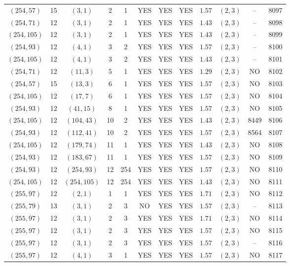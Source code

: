 \begin{longtable}{|c|c|c|c|c|c|c|c|c|c|c|c|}
$(254,57)$ & 15 & $(3,1)$ & 2 & 1 & YES & YES & YES & $1.57$ & $(2,3)$ & -- & 8097\\
$(254,71)$ & 12 & $(3,1)$ & 2 & 1 & YES & YES & YES & $1.43$ & $(2,3)$ & -- & 8098\\
$(254,105)$ & 12 & $(3,1)$ & 2 & 1 & YES & YES & YES & $1.43$ & $(2,3)$ & -- & 8099\\
$(254,93)$ & 12 & $(4,1)$ & 3 & 2 & YES & YES & YES & $1.57$ & $(2,3)$ & -- & 8100\\
$(254,105)$ & 12 & $(4,1)$ & 3 & 2 & YES & YES & YES & $1.43$ & $(2,3)$ & -- & 8101\\
$(254,71)$ & 12 & $(11,3)$ & 5 & 1 & YES & YES & YES & $1.29$ & $(2,3)$ & NO & 8102\\
$(254,57)$ & 15 & $(13,3)$ & 6 & 1 & YES & YES & YES & $1.57$ & $(2,3)$ & NO & 8103\\
$(254,105)$ & 12 & $(17,7)$ & 6 & 1 & YES & YES & YES & $1.57$ & $(2,3)$ & NO & 8104\\
$(254,93)$ & 12 & $(41,15)$ & 8 & 1 & YES & YES & YES & $1.57$ & $(2,3)$ & NO & 8105\\
$(254,105)$ & 12 & $(104,43)$ & 10 & 2 & YES & YES & YES & $1.43$ & $(2,3)$ & 8449 & 8106\\
$(254,93)$ & 12 & $(112,41)$ & 10 & 2 & YES & YES & YES & $1.57$ & $(2,3)$ & 8564 & 8107\\
$(254,105)$ & 12 & $(179,74)$ & 11 & 1 & YES & YES & YES & $1.43$ & $(2,3)$ & NO & 8108\\
$(254,93)$ & 12 & $(183,67)$ & 11 & 1 & YES & YES & YES & $1.57$ & $(2,3)$ & NO & 8109\\
$(254,93)$ & 12 & $(254,93)$ & 12 & 254 & YES & YES & YES & $1.57$ & $(2,3)$ & NO & 8110\\
$(254,105)$ & 12 & $(254,105)$ & 12 & 254 & YES & YES & YES & $1.43$ & $(2,3)$ & NO & 8111\\
$(255,97)$ & 12 & $(2,1)$ & 1 & 1 & YES & YES & YES & $1.71$ & $(2,3)$ & NO & 8112\\
$(255,79)$ & 13 & $(3,1)$ & 2 & 3 & NO & YES & YES & $1.57$ & $(2,3)$ & -- & 8113\\
$(255,97)$ & 12 & $(3,1)$ & 2 & 3 & YES & YES & YES & $1.71$ & $(2,3)$ & NO & 8114\\
$(255,97)$ & 12 & $(3,1)$ & 2 & 3 & YES & YES & YES & $1.57$ & $(2,3)$ & NO & 8115\\
$(255,97)$ & 12 & $(3,1)$ & 2 & 3 & YES & YES & YES & $1.57$ & $(2,3)$ & -- & 8116\\
$(255,97)$ & 12 & $(4,1)$ & 3 & 1 & YES & YES & YES & $1.57$ & $(2,3)$ & NO & 8117\\

\end{longtable}
